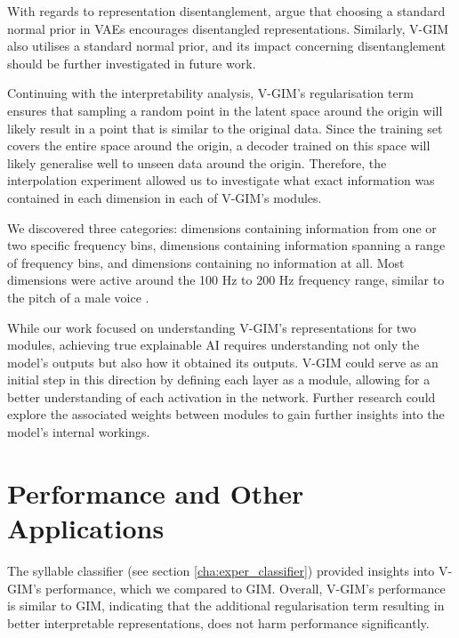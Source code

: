 	With regards to representation disentanglement, \cite{burgessUnderstandingDisentanglingBeta2018} argue that choosing a standard normal prior in VAEs encourages disentangled representations. Similarly, V-GIM also utilises a standard normal prior, and its impact concerning disentanglement should be further investigated in future work.
	
	

	Continuing with the interpretability analysis, V-GIM's regularisation term ensures that sampling a random point in the latent space around the origin will likely result in a point that is similar to the original data. Since the training set covers the entire space around the origin, a decoder trained on this space will likely generalise well to unseen data around the origin. Therefore, the interpolation experiment allowed us to investigate what exact information was contained in each dimension in each of V-GIM's modules. 
	
	We discovered three categories: dimensions containing information from one or two specific frequency bins, dimensions containing information spanning a range of frequency bins, and dimensions containing no information at all. Most dimensions were active around the 100 Hz to 200 Hz frequency range, similar to the pitch of a male voice \citep{rePreferencesVeryLow2012}.
	
	While our work focused on understanding V-GIM's representations for two modules, achieving true explainable AI requires understanding not only the model's outputs but also how it obtained its outputs. V-GIM could serve as an initial step in this direction by defining each layer as a module, allowing for a better understanding of each activation in the network. Further research could explore the associated weights between modules to gain further insights into the model's internal workings.

\section{Performance and Other Applications} 
	The syllable classifier (see section \ref{cha:exper_classifier}) provided insights into V-GIM's performance, which we compared to GIM. Overall, V-GIM's performance is similar to GIM, indicating that the additional regularisation term resulting in better interpretable representations, does not harm performance significantly.
	
